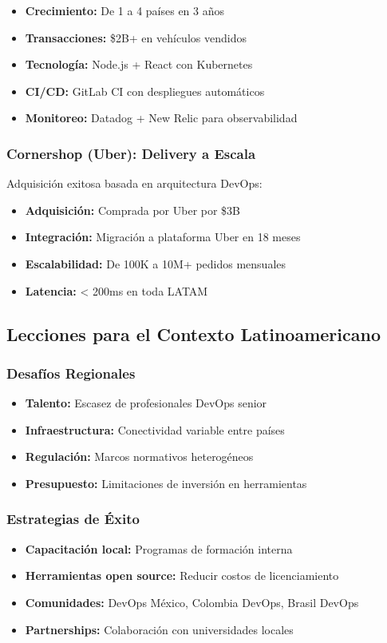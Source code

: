\documentclass[12pt,a4paper]{article}
\begin{document}
\begin{itemize}
    \item \textbf{Crecimiento:} De 1 a 4 países en 3 años
    \item \textbf{Transacciones:} \$2B+ en vehículos vendidos
    \item \textbf{Tecnología:} Node.js + React con Kubernetes
    \item \textbf{CI/CD:} GitLab CI con despliegues automáticos
    \item \textbf{Monitoreo:} Datadog + New Relic para observabilidad
\end{itemize}

\subsubsection{Cornershop (Uber): Delivery a Escala}
Adquisición exitosa basada en arquitectura DevOps:

\begin{itemize}
    \item \textbf{Adquisición:} Comprada por Uber por \$3B
    \item \textbf{Integración:} Migración a plataforma Uber en 18 meses
    \item \textbf{Escalabilidad:} De 100K a 10M+ pedidos mensuales
    \item \textbf{Latencia:} < 200ms en toda LATAM
\end{itemize}

\subsection{Lecciones para el Contexto Latinoamericano}

\subsubsection{Desafíos Regionales}
\begin{itemize}
    \item \textbf{Talento:} Escasez de profesionales DevOps senior
    \item \textbf{Infraestructura:} Conectividad variable entre países
    \item \textbf{Regulación:} Marcos normativos heterogéneos
    \item \textbf{Presupuesto:} Limitaciones de inversión en herramientas
\end{itemize}

\subsubsection{Estrategias de Éxito}
\begin{itemize}
    \item \textbf{Capacitación local:} Programas de formación interna
    \item \textbf{Herramientas open source:} Reducir costos de licenciamiento
    \item \textbf{Comunidades:} DevOps México, Colombia DevOps, Brasil DevOps
    \item \textbf{Partnerships:} Colaboración con universidades locales
\end{itemize}
\end{document}
